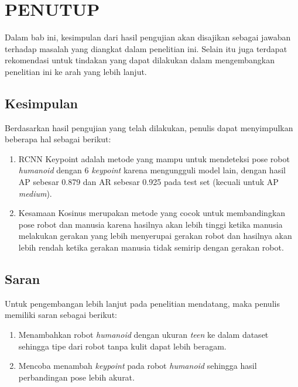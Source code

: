 \chapter{PENUTUP}
\label{chap:conclusion}

Dalam bab ini, kesimpulan dari hasil pengujian akan disajikan sebagai jawaban terhadap masalah yang diangkat dalam penelitian ini.
Selain itu juga terdapat rekomendasi untuk tindakan yang dapat dilakukan dalam mengembangkan penelitian ini ke arah yang lebih lanjut.

\section{Kesimpulan}
\label{sec:summary}

Berdasarkan hasil pengujian yang telah dilakukan, penulis dapat menyimpulkan beberapa hal sebagai berikut:

\begin{enumerate}[nolistsep]

  \item RCNN Keypoint adalah metode yang mampu untuk mendeteksi pose robot \textit{humanoid} dengan 6 \textit{keypoint} karena mengungguli model lain,
        dengan hasil AP sebesar 0.879 dan AR sebesar 0.925 pada test set (kecuali untuk AP \textit{medium}).
  \item Kesamaan Kosinus merupakan metode yang cocok untuk membandingkan pose robot dan manusia karena hasilnya akan lebih tinggi
        ketika manusia melakukan gerakan yang lebih menyerupai gerakan robot dan hasilnya akan lebih rendah ketika gerakan manusia tidak semirip dengan gerakan robot.

\end{enumerate}

\section{Saran}
\label{chap:suggestionsandfuturework}

Untuk pengembangan lebih lanjut pada penelitian mendatang, maka penulis memiliki saran sebagai berikut:

\begin{enumerate}[nolistsep]

  \item Menambahkan robot \textit{humanoid} dengan ukuran \textit{teen} ke dalam dataset sehingga tipe dari robot tanpa kulit dapat lebih beragam.
  \item Mencoba menambah \textit{keypoint} pada robot \textit{humanoid} sehingga hasil perbandingan pose lebih akurat.

\end{enumerate}
